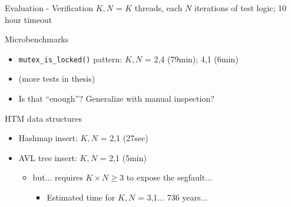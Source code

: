 \documentclass[xcolor=dvipsnames]{beamer}
\begin{document}
\begin{frame}{Evaluation - Verification}
	$K,N$ = $K$ threads, each $N$ iterations of test logic; 10 hour timeout
	\linegap

	Microbenchmarks
	\begin{itemize}
		\item {\tt mutex\_is\_locked()} pattern: $K,N$ = 2,4 (79min); 4,1 (6min)
		\item (more tests in thesis)
		\item Is that ``enough''? Generalize with manual inspection?
	\end{itemize}
	\pause
	\linegap

	HTM data structures
	\begin{itemize}
		\item Hashmap insert: $K,N$ = 2,1 (27sec) %
		\item AVL tree insert: $K,N$ = 2,1 (5min)
			\pause
		\begin{itemize}
			\item but... requires $K \times N \ge 3$ to expose the segfault...
			\begin{itemize}
				\item Estimated time for $K,N$ = 3,1... 736 years...
			\end{itemize}
		\end{itemize}
	\end{itemize}

\end{frame}
\end{document}
